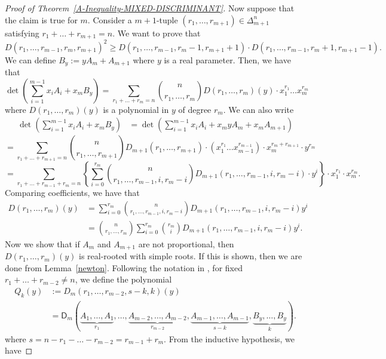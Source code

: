 \documentclass{puthesis-UG}
\begin{document}
\begin{proof}[Proof of Theorem~\ref{A-Inequality-MIXED-DISCRIMINANT}]
	Now suppose that the claim is true for $m$. Consider a $m+1$-tuple $(r_1, \ldots, r_{m+1}) \in \Delta_{m+1}^n$ satisfying $r_1 + \ldots + r_{m+1} = n$. We want to prove that 
	\[
		D(r_1, \ldots, r_{m-1}, r_m, r_{m+1})^2 \geq D(r_1, \ldots, r_{m-1}, r_m - 1, r_{m+1}+1) \cdot D(r_1, \ldots, r_{m-1}, r_m+1, r_{m+1}-1).
	\]
	We can define $B_y := y A_m + A_{m+1}$ where $y$ is a real parameter. Then, we have that
	\[
		\det \left ( \sum_{i = 1}^{m-1} x_i A_i + x_m B_y \right ) = \sum_{r_1 + \ldots + r_m = n} \binom{n}{r_1, \ldots, r_m} D(r_1, \ldots, r_m) (y) \cdot x_1^{r_1} \ldots x_m^{r_m}
	\]
	where $D(r_1, \ldots, r_m)(y)$ is a polynomial in $y$ of degree $r_m$. We can also write 
	\begin{align*}
		\det \left ( \sum_{i = 1}^{m-1} x_i A_i + x_m B_y \right ) & = \det \left ( \sum_{i = 1}^{m-1} x_i A_i + x_m y A_m + x_m A_{m+1} \right ) 
	\end{align*}
	\[ = \sum_{r_1 + \ldots + r_{m+1} = n} \binom{n}{r_1, \ldots, r_{m+1}} D_{m+1}(r_1, \ldots, r_{m+1}) \cdot (x_1^{r_1} \ldots x_{m-1}^{r_{m-1}}) \cdot x_m^{r_m + r_{m+1}} \cdot y^{r_m} 
	\]
	\[
	= \sum_{r_1 + \ldots + r_{m-1} + r_m = n} \left \{ \sum_{i = 0}^{r_m} \binom{n}{r_1, \ldots, r_{m-1}, i, r_m - i} D_{m+1}(r_1, \ldots, r_{m-1}, i, r_m - i) \cdot y^i \right \} \cdot x_1^{r_1} \cdot x_m^{r_m}.
	\]
	Comparing coefficients, we have that 
	\begin{align*}
		D(r_1, \ldots, r_m)(y) & = \sum_{i = 0}^{r_m} \binom{n}{r_1, \ldots, r_{m-1}, i, r_m - i} D_{m+1}(r_1, \ldots, r_{m-1},i, r_m-i) y^i \\
		& = \binom{n}{r_1, \ldots, r_m} \sum_{i = 0}^{r_m} \binom{r_m}{i} D_{m+1}(r_1, \ldots, r_{m-1}, i, r_m - i) y^i.
	\end{align*}
	Now we show that if $A_m$ and $A_{m+1}$ are not proportional, then $D(r_1, \ldots, r_m)(y)$ is real-rooted with simple roots. If this is shown, then we are done from Lemma~\ref{newton}. Following the notation in \cite{schneider-mixed-discriminants}, for fixed $r_1 + \ldots + r_{m-2} \neq n$, we define the polynomial
	\begin{align*}
		Q_k(y) & := D_m(r_1, \ldots, r_{m-2}, s-k, k) (y) \\
		& = \mathsf{D}_m (\underbrace{A_1, \ldots, A_1}_{r_1}, \ldots, \underbrace{A_{m-2}, \ldots, A_{m-2}}_{r_{m-2}}, \underbrace{A_{m-1}, \ldots, A_{m-1}}_{s-k}, \underbrace{B_y, \ldots, B_y}_k).
	\end{align*}
	where $s = n - r_1 - \ldots - r_{m-2} = r_{m-1} + r_m$. From the inductive hypothesis, we have 

\end{proof}
\end{document}
